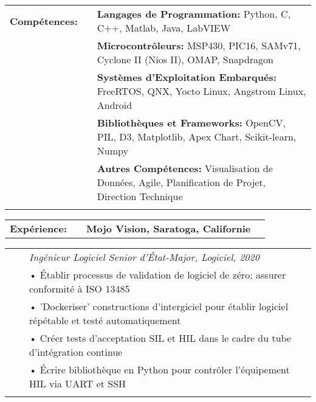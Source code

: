 \documentclass{minimal}
\begin{document}

\begin{center}
\fontsize{14}{12.8}\selectfont
\name\\
\fontsize{10}{12}\selectfont
\address\\
\phone\\
\email\\
\github\\
\end{center}
\vspace{0.5cm}

\begin{tabular}{ p{1.5cm} p{1cm} p{16cm} }
\textbf{Compétences:} & & \textbf{Langages de Programmation:} Python, C, C++, Matlab, Java, LabVIEW\\
& & \textbf{Microcontrôleurs:} MSP430, PIC16, SAMv71, Cyclone II (Nios II), OMAP, Snapdragon\\
& & \textbf{Systèmes d'Exploitation Embarqués:} FreeRTOS, QNX, Yocto Linux, Angstrom Linux, Android\\
& & \textbf{Bibliothèques et Frameworks:} OpenCV, PIL, D3, Matplotlib, Apex Chart, Scikit-learn, Numpy\\
& & \textbf{Autres Compétences:} Visualisation de Données, Agile, Planification de Projet, Direction Technique\\
& & \\
\end{tabular}

\begin{tabular}{ p{1.5cm} p{1cm} p{16cm} >{\raggedleft\arraybackslash}p{3cm} }
\textbf{Expérience:} & & \textbf{Mojo Vision, Saratoga, Californie} & \\
\end{tabular}

\begin{tabular}{ p{1.5cm} p{1cm} p{16cm} }
& & \textit{Ingénieur Logiciel Senior d'État-Major, Logiciel, 2020}\\
& & • Établir processus de validation de logiciel de zéro; assurer conformité à ISO 13485\\
& & • 'Dockeriser' constructions d'intergiciel pour établir logiciel répétable et testé automatiquement\\
& & • Créer tests d'acceptation SIL et HIL dans le cadre du tube d'intégration continue\\
& & • Écrire bibliothèque en Python pour contrôler l'équipement HIL via UART et SSH\\
& & \\
\end{tabular}
\end{document}
